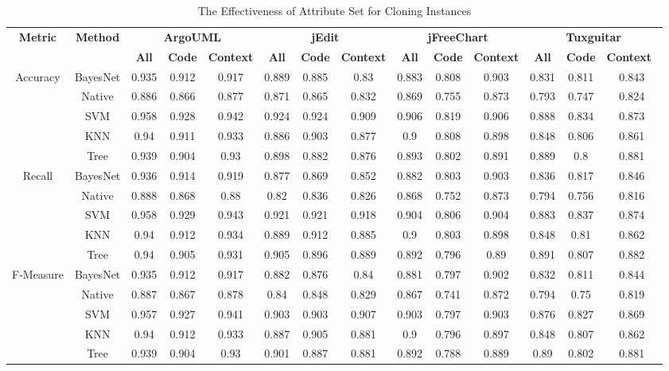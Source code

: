 \begin{table*}[ht]
\scriptsize
\caption{The Effectiveness of Attribute Set for Cloning Instances}
\label{cloningset}
\centering
\begin{tabular}{|c|c|c|c|c|c|c|c|c|c|c|c|c|c|}
\hline
\multirow{2}{*}{\textbf{Metric}}&\multirow{2}{*}{\textbf{Method}}&\multicolumn{3}{|c|}{\textbf{ArgoUML}}&\multicolumn{3}{|c|}{\textbf{jEdit}}&\multicolumn{3}{|c|}{\textbf{jFreeChart}}&\multicolumn{3}{|c|}{\textbf{Tuxguitar}}\\
\cline{3-14}
&&\textbf{All}&\textbf{Code}&\textbf{Context}&\textbf{All}&\textbf{Code}&\textbf{Context}&\textbf{All}&\textbf{Code}&\textbf{Context}&\textbf{All}&\textbf{Code}&\textbf{Context}~\\
\hline
\multirow{5}{*}{Accuracy}
&BayesNet&	0.935&	0.912&	0.917&		0.889&	0.885&	0.83&		0.883&	0.808&	0.903&		0.831&	0.811&	0.843\\
&Native&	0.886&	0.866&	0.877&		0.871&	0.865&	0.832&		0.869&	0.755&	0.873&		0.793&	0.747&	0.824\\
&SVM&	0.958&	0.928&	0.942&		0.924&	0.924&	0.909&		0.906&	0.819&	0.906&		0.888&	0.834&	0.873\\
&KNN&	0.94&	0.911&	0.933&		0.886&	0.903&	0.877&		0.9	&0.808&	0.898&		0.848&	0.806&	0.861\\
&Tree&	0.939&	0.904&	0.93&		0.898&	0.882&	0.876&		0.893&	0.802&	0.891&		0.889&	0.8&	0.881\\
\hline
\multirow{5}{*}{Recall}
&BayesNet&	0.936&	0.914&	0.919&		0.877&	0.869&	0.852&		0.882&	0.803&	0.903&		0.836&	0.817&	0.846\\
&Native&	0.888&	0.868&	0.88&		0.82&	0.836&	0.826&		0.868&	0.752&	0.873&		0.794&	0.756&	0.816\\
&SVM&	0.958&	0.929&	0.943&		0.921&	0.921&	0.918&		0.904&	0.806&	0.904&		0.883&	0.837&	0.874\\
&KNN&	0.94&	0.912&	0.934&		0.889&	0.912&	0.885&		0.9&	0.803&	0.898&		0.848&	0.81&	0.862\\
&Tree&	0.94&	0.905&	0.931&		0.905&	0.896&	0.889&		0.892&	0.796&	0.89&		0.891&	0.807&	0.882\\
\hline
\multirow{5}{*}{F-Measure}
&BayesNet&	0.935&	0.912&	0.917&		0.882&	0.876&	0.84&		0.881&	0.797&	0.902&		0.832&	0.811&	0.844\\
&Native&	0.887&	0.867&	0.878&		0.84&	0.848&	0.829&		0.867&	0.741&	0.872&		0.794&	0.75&	0.819\\
&SVM&	0.957&	0.927&	0.941&		0.903&	0.903&	0.907&		0.903&	0.797&	0.903&		0.876&	0.827&	0.869\\
&KNN&	0.94&	0.912&	0.933&		0.887&	0.905&	0.881&		0.9&	0.796&	0.897&		0.848&	0.807&	0.862\\
&Tree&	0.939&	0.904&	0.93&		0.901&	0.887&	0.881&		0.892&	0.788&	0.889&		0.89&	0.802&	0.881\\
\hline
\end{tabular}
\end{table*}

